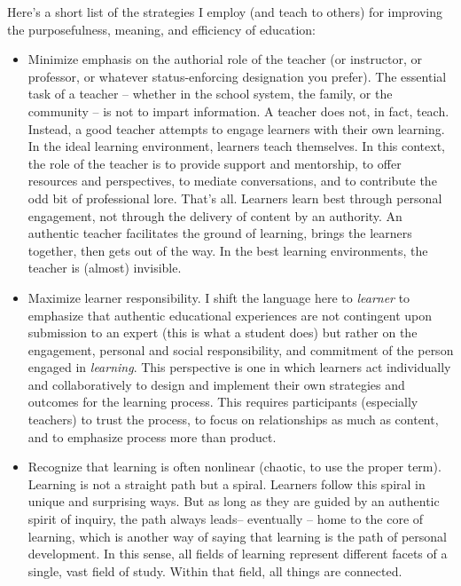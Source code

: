 \documentclass[10pt,DIV09,letterpaper,oneside,headsepline]{scrreprt}
\begin{document}
Here's a short list of the strategies I employ (and teach to others) for improving the purposefulness, meaning, and efficiency of education:

\begin{itemize}

\item Minimize emphasis on the authorial role of the teacher (or instructor, or professor, or whatever status-enforcing designation you prefer). The essential task of a teacher -- whether in the school system, the family, or the community -- is not to impart information. A teacher does not, in fact, teach. Instead, a good teacher attempts to engage learners with their own learning. In the ideal learning environment, learners teach themselves. In this context, the role of the teacher is to provide support and mentorship, to offer resources and perspectives, to mediate conversations, and to contribute the odd bit of professional lore. That’s all. Learners learn best through personal engagement, not through the delivery of content by an authority. An authentic teacher facilitates the ground of learning, brings the learners together, then gets out of the way. In the best learning environments, the teacher is (almost) invisible.

\item Maximize learner responsibility. I shift the language here to \textit{learner} to emphasize that authentic educational experiences are not contingent upon submission to an expert (this is what a student does) but rather on the engagement, personal and social responsibility, and commitment of the person engaged in \textit{learning}. This perspective is one in which learners act individually and collaboratively to design and implement their own strategies and outcomes for the learning process. This requires participants (especially teachers) to trust the process, to focus on relationships as much as content, and to emphasize process more than product.

\item Recognize that learning is often nonlinear (chaotic, to use the proper term). Learning is not a straight path but a spiral. Learners follow this spiral in unique and surprising ways. But as long as they are guided by an authentic spirit of inquiry, the path always leads-- eventually -- home to the core of learning, which is another way of saying that learning is the path of personal development. In this sense, all fields of learning represent different facets of a single, vast field of study. Within that field, all things are connected.


\end{itemize}
\end{document}
